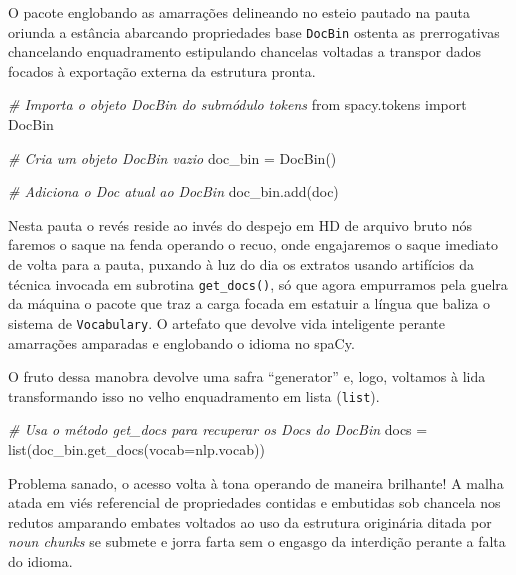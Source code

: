 \documentclass[
  brazilian,
]{article}
\newenvironment{Shaded}{}{}
\newcommand{\BuiltInTok}[1]{#1}
\newcommand{\CommentTok}[1]{\textcolor[rgb]{0.38,0.63,0.69}{\textit{#1}}}
\newcommand{\ImportTok}[1]{#1}
\newcommand{\NormalTok}[1]{#1}
\newcommand{\OperatorTok}[1]{\textcolor[rgb]{0.40,0.40,0.40}{#1}}
\begin{document}
O pacote englobando as amarrações delineando no esteio pautado na pauta
oriunda a estância abarcando propriedades base \texttt{DocBin} ostenta
as prerrogativas chancelando enquadramento estipulando chancelas
voltadas a transpor dados focados à exportação externa da estrutura
pronta.

\begin{Shaded}
\begin{Highlighting}[]
\CommentTok{\# Importa o objeto DocBin do submódulo \textquotesingle{}tokens\textquotesingle{}}
\ImportTok{from}\NormalTok{ spacy.tokens }\ImportTok{import}\NormalTok{ DocBin}

\CommentTok{\# Cria um objeto DocBin vazio}
\NormalTok{doc\_bin }\OperatorTok{=}\NormalTok{ DocBin()}

\CommentTok{\# Adiciona o Doc atual ao DocBin}
\NormalTok{doc\_bin.add(doc)}
\end{Highlighting}
\end{Shaded}

Nesta pauta o revés reside ao invés do despejo em HD de arquivo bruto
nós faremos o saque na fenda operando o recuo, onde engajaremos o saque
imediato de volta para a pauta, puxando à luz do dia os extratos usando
artifícios da técnica invocada em subrotina \texttt{get\_docs()}, só que
agora empurramos pela guelra da máquina o pacote que traz a carga focada
em estatuir a língua que baliza o sistema de \texttt{Vocabulary}. O
artefato que devolve vida inteligente perante amarrações amparadas e
englobando o idioma no spaCy.

O fruto dessa manobra devolve uma safra ``generator'' e, logo, voltamos
à lida transformando isso no velho enquadramento em lista
(\texttt{list}).

\begin{Shaded}
\begin{Highlighting}[]
\CommentTok{\# Usa o método \textquotesingle{}get\_docs\textquotesingle{} para recuperar os Docs do DocBin}
\NormalTok{docs }\OperatorTok{=} \BuiltInTok{list}\NormalTok{(doc\_bin.get\_docs(vocab}\OperatorTok{=}\NormalTok{nlp.vocab))}
\end{Highlighting}
\end{Shaded}

Problema sanado, o acesso volta à tona operando de maneira brilhante! A
malha atada em viés referencial de propriedades contidas e embutidas sob
chancela nos redutos amparando embates voltados ao uso da estrutura
originária ditada por \emph{noun chunks} se submete e jorra farta sem o
engasgo da interdição perante a falta do idioma.
\end{document}
